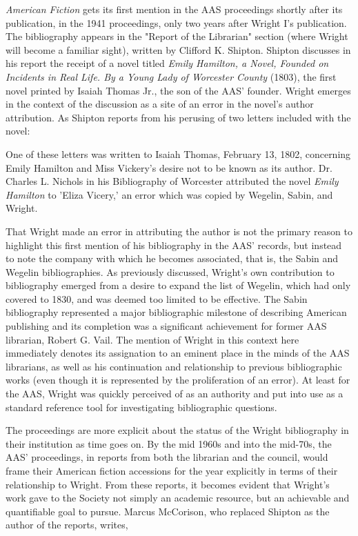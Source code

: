 \textit{American Fiction} gets its first mention in the AAS proceedings shortly after its publication, in the 1941 proceedings, only two years after Wright I's publication. The bibliography appears in the "Report of the Librarian" section (where Wright will become a familiar sight), written by Clifford K. Shipton. Shipton discusses in his report the receipt of a novel titled \textit{Emily Hamilton, a Novel, Founded on Incidents in Real Life. By a Young Lady of Worcester County} (1803), the first novel printed by Isaiah Thomas   Jr., the son of the AAS' founder. Wright emerges in the context of the discussion as a site of an error in the novel's author attribution. As Shipton reports from his perusing of two letters included with the novel:
\begin{displayquote}
One of these letters was written to Isaiah Thomas, February 13, 1802, concerning Emily Hamilton and Miss Vickery's desire not to be known as its author. Dr. Charles L. Nichols in his Bibliography of Worcester attributed the novel \textit{Emily Hamilton} to 'Eliza Vicery,' an error which was copied by Wegelin, Sabin, and Wright.\autocite[270]{clifford_k._shipton_report_1941}
\end{displayquote}
That Wright made an error in attributing the author is not  the primary reason to highlight this first mention of his bibliography in the AAS' records, but instead to note the company with which he becomes associated, that is, the Sabin and Wegelin bibliographies. As previously discussed, Wright's own contribution to bibliography emerged from a desire to expand the list of Wegelin, which had only covered to 1830, and was deemed too limited to be effective. The Sabin bibliography represented a major bibliographic milestone of describing American publishing and its completion was a significant achievement for former AAS librarian, Robert G. Vail. The mention of Wright in this context here immediately denotes its assignation to an eminent place in the minds of the AAS librarians, as well as his continuation and relationship to previous bibliographic works (even though it is represented by the proliferation of an error). At least for the AAS, Wright was quickly perceived of as an authority and put into use as a standard reference tool  for investigating bibliographic questions.

The proceedings are more explicit about the status of the Wright bibliography in their institution as time goes on. By the mid 1960s and into the mid-70s, the AAS' proceedings, in reports from both the librarian and the council, would frame their American fiction accessions for the year explicitly in terms of their relationship to Wright. From these reports, it becomes evident that Wright's work gave to the Society not simply an academic resource, but an achievable and quantifiable goal to pursue. Marcus McCorison, who replaced Shipton as the author of the reports, writes,

